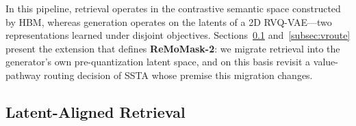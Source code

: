 In this pipeline, retrieval operates in the contrastive semantic space constructed by HBM, whereas generation operates on the latents of a 2D RVQ-VAE---two representations learned under disjoint objectives. Sections~\ref{subsec:lar} and~\ref{subsec:vroute} present the extension that defines \textbf{ReMoMask-2}: we migrate retrieval into the generator's own pre-quantization latent space, and on this basis revisit a value-pathway routing decision of SSTA whose premise this migration changes.



\subsection{Latent-Aligned Retrieval}
\label{subsec:lar}

